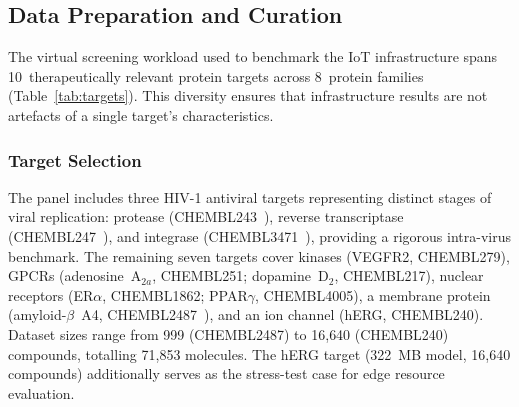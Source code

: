 \documentclass[conference]{IEEEtran}
\begin{document}
\begin{table}[!t]
\centering
\caption{\textcolor{black}{real edge hardware used for evaluation
(no resource caps).}}
\label{tab:edge-tiers}
\end{table}

\subsection{\textbf{Data Preparation and Curation}}
\label{sec:data}

The virtual screening workload used to benchmark the IoT
infrastructure spans 10~therapeutically relevant protein targets
across 8~protein families (Table~\ref{tab:targets}).
This diversity ensures that infrastructure results are not
artefacts of a single target's characteristics.

\subsubsection{Target Selection}
The panel includes three HIV-1 antiviral targets representing
distinct stages of viral replication: protease
(CHEMBL243~\cite{ebiTargetHumanProt}), reverse transcriptase
(CHEMBL247~\cite{ebiTargetHuman}), and integrase
(CHEMBL3471~\cite{ebiTargetHumanInte}), providing a rigorous
intra-virus benchmark.
The remaining seven targets cover kinases (VEGFR2, CHEMBL279),
GPCRs (adenosine~A$_{2a}$, CHEMBL251; dopamine~D$_2$, CHEMBL217),
nuclear receptors (ER$\alpha$, CHEMBL1862; PPAR$\gamma$,
CHEMBL4005), a membrane protein (amyloid-$\beta$~A4,
CHEMBL2487~\cite{ebiTargetAmyloidbeta}), and an ion channel
(hERG, CHEMBL240).
Dataset sizes range from 999 (CHEMBL2487) to 16{,}640 (CHEMBL240)
compounds, totalling 71{,}853 molecules.
The hERG target (322~MB model, 16{,}640 compounds) additionally
serves as the stress-test case for edge resource evaluation.
\end{document}
